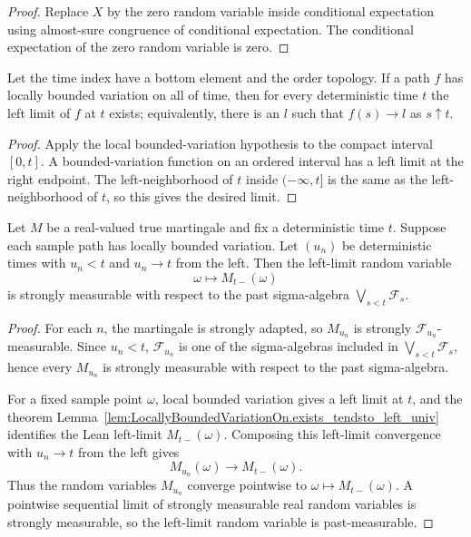 \begin{proof}
Replace \(X\) by the zero random variable inside conditional expectation using
almost-sure congruence of conditional expectation.  The conditional
expectation of the zero random variable is zero.
\end{proof}


\begin{lemma}\label{lem:LocallyBoundedVariationOn.exists_tendsto_left_univ}
Let the time index have a bottom element and the order topology.  If a path
\(f\) has locally bounded variation on all of time, then for every
deterministic time \(t\) the left limit of \(f\) at \(t\) exists; equivalently,
there is an \(l\) such that \(f(s)\to l\) as \(s\uparrow t\).
\end{lemma}

\begin{proof}
Apply the local bounded-variation hypothesis to the compact interval
\([0,t]\).  A bounded-variation function on an ordered interval has a left
limit at the right endpoint.  The left-neighborhood of \(t\) inside
\((-\infty,t]\) is the same as the left-neighborhood of \(t\), so this gives
the desired limit.
\end{proof}

\begin{lemma}\label{lem:Martingale.stronglyMeasurable_leftLim_past_of_left_approach}
Let \(M\) be a real-valued true martingale and fix a deterministic time
\(t\).  Suppose each sample path has locally bounded variation.  Let
\((u_n)\) be deterministic times with \(u_n<t\) and \(u_n\to t\) from the
left.  Then the left-limit random variable
\[
  \omega\longmapsto M_{t-}(\omega)
\]
is strongly measurable with respect to the past sigma-algebra
\(\bigvee_{s<t}\mathcal F_s\).
\end{lemma}

\begin{proof}
For each \(n\), the martingale is strongly adapted, so \(M_{u_n}\) is
strongly \(\mathcal F_{u_n}\)-measurable.  Since \(u_n<t\),
\(\mathcal F_{u_n}\) is one of the sigma-algebras included in
\(\bigvee_{s<t}\mathcal F_s\), hence every \(M_{u_n}\) is strongly
measurable with respect to the past sigma-algebra.

For a fixed sample point \(\omega\), local bounded variation gives a left
limit at \(t\), and the theorem
Lemma~\ref{lem:LocallyBoundedVariationOn.exists_tendsto_left_univ} identifies
the Lean left-limit \(M_{t-}(\omega)\).  Composing this left-limit convergence
with \(u_n\to t\) from the left gives
\[
  M_{u_n}(\omega)\to M_{t-}(\omega).
\]
Thus the random variables \(M_{u_n}\) converge pointwise to
\(\omega\mapsto M_{t-}(\omega)\).  A pointwise sequential limit of strongly
measurable real random variables is strongly measurable, so the left-limit
random variable is past-measurable.
\end{proof}

